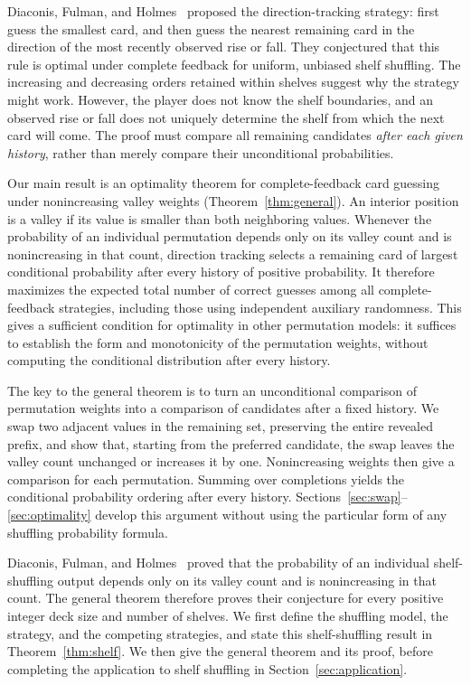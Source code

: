 \documentclass[11pt,reqno]{amsart}
\numberwithin{equation}{section}
\theoremstyle{definition}
\theoremstyle{remark}
\begin{document}
Diaconis, Fulman, and Holmes~\cite[Section 5.1]{DFH} proposed the direction-tracking strategy: first guess the smallest card, and then guess the nearest remaining card in the direction of the most recently observed rise or fall. They conjectured that this rule is optimal under complete feedback for uniform, unbiased shelf shuffling. The increasing and decreasing orders retained within shelves suggest why the strategy might work. However, the player does not know the shelf boundaries, and an observed rise or fall does not uniquely determine the shelf from which the next card will come. The proof must compare all remaining candidates \emph{after each given history}, rather than merely compare their unconditional probabilities.

Our main result is an optimality theorem for complete-feedback card guessing under nonincreasing valley weights (Theorem~\ref{thm:general}). An interior position is a valley if its value is smaller than both neighboring values. Whenever the probability of an individual permutation depends only on its valley count and is nonincreasing in that count, direction tracking selects a remaining card of largest conditional probability after every history of positive probability. It therefore maximizes the expected total number of correct guesses among all complete-feedback strategies, including those using independent auxiliary randomness. This gives a sufficient condition for optimality in other permutation models: it suffices to establish the form and monotonicity of the permutation weights, without computing the conditional distribution after every history.

The key to the general theorem is to turn an unconditional comparison of permutation weights into a comparison of candidates after a fixed history. We swap two adjacent values in the remaining set, preserving the entire revealed prefix, and show that, starting from the preferred candidate, the swap leaves the valley count unchanged or increases it by one. Nonincreasing weights then give a comparison for each permutation. Summing over completions yields the conditional probability ordering after every history. Sections~\ref{sec:swap}--\ref{sec:optimality} develop this argument without using the particular form of any shuffling probability formula.

Diaconis, Fulman, and Holmes~\cite[Theorem 3.1 and Corollary 3.3]{DFH} proved that the probability of an individual shelf-shuffling output depends only on its valley count and is nonincreasing in that count. The general theorem therefore proves their conjecture for every positive integer deck size and number of shelves. We first define the shuffling model, the strategy, and the competing strategies, and state this shelf-shuffling result in Theorem~\ref{thm:shelf}. We then give the general theorem and its proof, before completing the application to shelf shuffling in Section~\ref{sec:application}.
\end{document}
